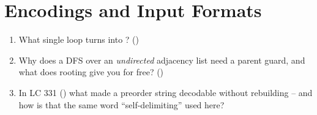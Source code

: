 \section{Encodings and Input Formats}\label{sec:c04-formats}

\begin{previouslybox}
\begin{enumerate}[nosep, leftmargin=1.6em]
  \item What single loop turns  into ? ()
  \item Why does a DFS over an \emph{undirected} adjacency list need a parent guard, and
        what does rooting give you for free? ()
  \item In LC 331 () what made a preorder string decodable without
        rebuilding -- and how is that the same word ``self-delimiting'' used here?
\end{enumerate}
\end{previouslybox}

